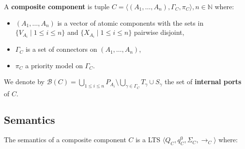 \documentclass[a4paper]{article}
\begin{document}
A \textbf{composite component} is tuple $C = \langle (A_1, \ldots, A_n), \Gamma_C, \pi_C \rangle, n \in \mathbb{N}$
where:
\begin{itemize}
  \item $(A_1, \ldots, A_n)$ is a vector of atomic components with the sets in $\{V_{A_i} \mid 1 \leq i \leq n\}$ and
        $\{X_{A_i} \mid 1 \leq i \leq n\}$ pairwise disjoint,
  \item $\Gamma_C$ is a set of connectors on $(A_1, \ldots, A_n)$,
  \item $\pi_C$ a priority model on $\Gamma_C$.
\end{itemize}
We denote by $\mathcal{B}(C) = \bigcup_{1 \leq i \leq n} P_{A_i} \setminus \bigcup_{\gamma \in \Gamma_C} T_{\gamma}
  \cup S_{\gamma}$ the set of \textbf{internal ports} of $C$.
\subsection*{Semantics}
The semantics of a composite component $C$ is a LTS $\langle Q_C, q^0_C, \Sigma_C, \xrightarrow{}_C \rangle$ where:
\end{document}
